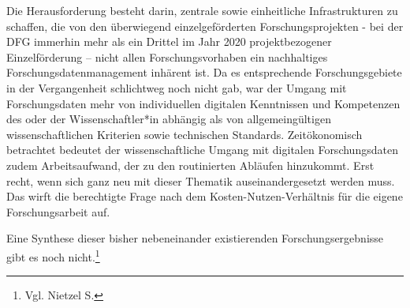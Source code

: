 Die Herausforderung besteht darin, zentrale sowie einheitliche Infrastrukturen zu schaffen, die von den überwiegend einzelgeförderten Forschungsprojekten - bei der DFG immerhin mehr als ein Drittel im Jahr 2020 projektbezogener Einzelförderung – nicht allen Forschungsvorhaben ein nachhaltiges Forschungsdatenmanagement inhärent ist. Da es entsprechende Forschungsgebiete in der Vergangenheit schlichtweg noch nicht gab, war der Umgang mit Forschungsdaten mehr von individuellen digitalen Kenntnissen und Kompetenzen des oder der Wissenschaftler*in abhängig als von allgemeingültigen wissenschaftlichen Kriterien sowie technischen Standards. Zeitökonomisch betrachtet bedeutet der wissenschaftliche Umgang mit digitalen Forschungsdaten zudem Arbeitsaufwand, der zu den routinierten Abläufen hinzukommt. Erst recht, wenn sich ganz neu mit dieser Thematik auseinandergesetzt werden muss. Das wirft die berechtigte Frage nach dem Kosten-Nutzen-Verhältnis für die eigene Forschungsarbeit auf.

Eine Synthese dieser bisher nebeneinander existierenden Forschungsergebnisse gibt es noch nicht.\footnote{Vgl. Nietzel S.}